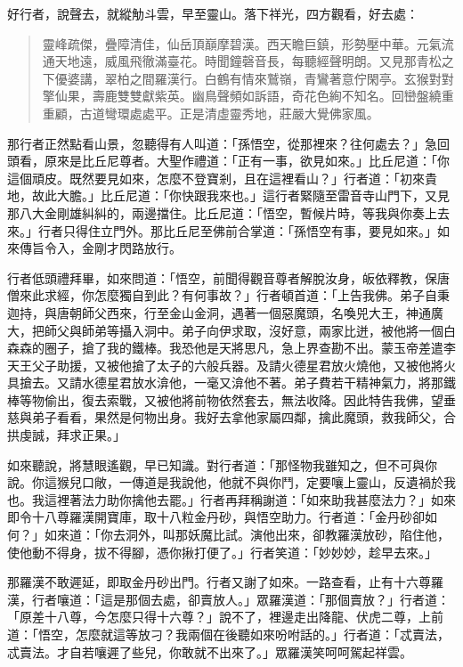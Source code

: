 好行者，說聲去，就縱觔斗雲，早至靈山。落下祥光，四方觀看，好去處：
\begin{quote}
靈峰疏傑，疊障清佳，仙岳頂巔摩碧漢。西天瞻巨鎮，形勢壓中華。元氣流通天地遠，威風飛徹滿臺花。時聞鐘磬音長，每聽經聲明朗。又見那青松之下優婆講，翠柏之間羅漢行。白鶴有情來鷲嶺，青鸞著意佇閑亭。玄猴對對擎仙果，壽鹿雙雙獻紫英。幽鳥聲頻如訴語，奇花色絢不知名。回巒盤繞重重顧，古道彎環處處平。正是清虛靈秀地，莊嚴大覺佛家風。
\end{quote}

那行者正然點看山景，忽聽得有人叫道：「孫悟空，從那裡來？往何處去？」急回頭看，原來是比丘尼尊者。大聖作禮道：「正有一事，欲見如來。」比丘尼道：「你這個頑皮。既然要見如來，怎麼不登寶剎，且在這裡看山？」行者道：「初來貴地，故此大膽。」比丘尼道：「你快跟我來也。」這行者緊隨至雷音寺山門下，又見那八大金剛雄糾糾的，兩邊擋住。比丘尼道：「悟空，暫候片時，等我與你奏上去來。」行者只得住立門外。那比丘尼至佛前合掌道：「孫悟空有事，要見如來。」如來傳旨令入，金剛才閃路放行。

行者低頭禮拜畢，如來問道：「悟空，前聞得觀音尊者解脫汝身，皈依釋教，保唐僧來此求經，你怎麼獨自到此？有何事故？」行者頓首道：「上告我佛。弟子自秉迦持，與唐朝師父西來，行至金山金洞，遇著一個惡魔頭，名喚兕大王，神通廣大，把師父與師弟等攝入洞中。弟子向伊求取，沒好意，兩家比迸，被他將一個白森森的圈子，搶了我的鐵棒。我恐他是天將思凡，急上界查勘不出。蒙玉帝差遣李天王父子助援，又被他搶了太子的六般兵器。及請火德星君放火燒他，又被他將火具搶去。又請水德星君放水渰他，一毫又渰他不著。弟子費若干精神氣力，將那鐵棒等物偷出，復去索戰，又被他將前物依然套去，無法收降。因此特告我佛，望垂慈與弟子看看，果然是何物出身。我好去拿他家屬四鄰，擒此魔頭，救我師父，合拱虔誠，拜求正果。」

如來聽說，將慧眼遙觀，早已知識。對行者道：「那怪物我雖知之，但不可與你說。你這猴兒口敞，一傳道是我說他，他就不與你鬥，定要嚷上靈山，反遺禍於我也。我這裡著法力助你擒他去罷。」行者再拜稱謝道：「如來助我甚麼法力？」如來即令十八尊羅漢開寶庫，取十八粒金丹砂，與悟空助力。行者道：「金丹砂卻如何？」如來道：「你去洞外，叫那妖魔比試。演他出來，卻教羅漢放砂，陷住他，使他動不得身，拔不得腳，憑你揪打便了。」行者笑道：「妙妙妙，趁早去來。」

那羅漢不敢遲延，即取金丹砂出門。行者又謝了如來。一路查看，止有十六尊羅漢，行者嚷道：「這是那個去處，卻賣放人。」眾羅漢道：「那個賣放？」行者道：「原差十八尊，今怎麼只得十六尊？」說不了，裡邊走出降龍、伏虎二尊，上前道：「悟空，怎麼就這等放刁？我兩個在後聽如來吩咐話的。」行者道：「忒賣法，忒賣法。才自若嚷遲了些兒，你敢就不出來了。」眾羅漢笑呵呵駕起祥雲。


